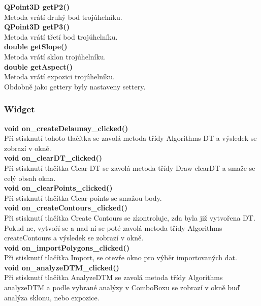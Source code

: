 \documentclass[a4paper,11pt,twoside]{article}
\begin{document}
\noindent\textbf{ QPoint3D getP2()}\\
Metoda vrátí druhý bod trojúhelníku.\\

\noindent\textbf{ QPoint3D getP3()}\\
Metoda vrátí třetí bod trojúhelníku.\\

\noindent\textbf{double getSlope()}\\
Metoda vrátí sklon trojúhelníku.\\

\noindent\textbf{double getAspect()}\\
Metoda vrátí expozici trojúhelníku.\\

\noindent Obdobně jako gettery byly nastaveny settery.

\subsubsection{Widget}

\noindent\textbf{void on\_createDelaunay\_clicked()}\\
Při stisknutí tohoto tlačítka se zavolá metoda třídy Algorithms DT a výsledek se zobrazí v okně. \\

\noindent\textbf{void on\_clearDT\_clicked()}\\
Při stisknutí tlačítka Clear DT se zavolá metoda třídy Draw clearDT a smaže se celý obsah okna.\\

\noindent\textbf{void on\_clearPoints\_clicked()}\\
Při stisknutí tlačítka Clear points se smažou body.\\

\noindent\textbf{void on\_createContours\_clicked()}\\
Při stisknutí tlačítka Create Contours se zkontroluje, zda byla již vytvořena DT. Pokud ne, vytvoří se a nad ní se poté zavolá metoda třídy Algorithms createContours a výsledek se zobrazí v okně.\\

\noindent\textbf{void on\_importPolygons\_clicked()}\\
Při stisknutí tlačítka Import, se otevře okno pro výběr importovaných dat. \\

\noindent\textbf{void on\_analyzeDTM\_clicked()}\\
Při stisknutí tlačítka AnalyzeDTM se zavolá metoda třídy Algorithms analyzeDTM a podle vybrané analýzy v ComboBoxu se zobrazí v okně buď analýza sklonu, nebo expozice. \\
\end{document}
